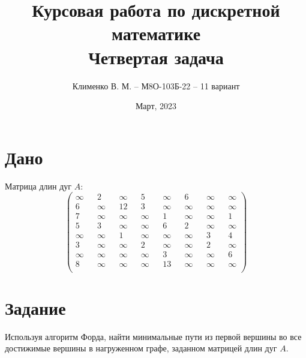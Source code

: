 \documentclass{article}
\title{Курсовая работа по дискретной математике\\Четвертая задача}
\author{Клименко В. М. -- М8О-103Б-22 -- 11 вариант}
\date{Март, 2023}
\begin{document}
\maketitle


\section*{Дано}
Матрица длин дуг $A$:
$$
\begin{pmatrix}
    \infty && 2      && \infty  && 5      && \infty && 6      && \infty && \infty \\
    6      && \infty && 12      && 3      && \infty && \infty && \infty && \infty \\
    7      && \infty && \infty  && \infty && 1      && \infty && \infty && 1      \\
    5      && 3      && \infty  && \infty && 6      && 2      && \infty && \infty \\
    \infty && \infty && 1       && \infty && \infty && \infty && 3      && 4      \\
    3      && \infty && \infty  && 2      && \infty && \infty && 2      && \infty \\
    \infty && \infty && \infty  && \infty && 3      && \infty && \infty && 6      \\
    8      && \infty && \infty  && \infty && 13     && \infty && \infty && \infty \\
\end{pmatrix}
$$


\section*{Задание}
Используя алгоритм Форда, найти минимальные пути из первой вершины во
все достижимые вершины в нагруженном графе, заданном матрицей длин дуг $A$.
\end{document}

